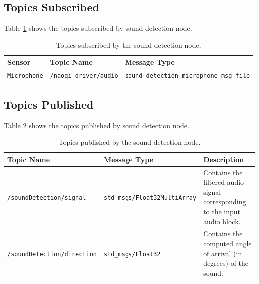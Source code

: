 \documentclass{CSSRforAfrica}
\begin{document}
\subsection*{Topics Subscribed}
Table \ref{Table: topics subscribed} shows the topics subscribed by sound detection node.

\begin{table}[!h]
	\centering
	\begin{tabularx}{\linewidth}{| l | l | X |}
		\hline
		\rowcolor{blue!20} %
		\textbf{Sensor} & \textbf{Topic Name} & \textbf{Message Type} \\
		\hline
		{\footnotesize \texttt{Microphone} }  & {\footnotesize \texttt{/naoqi\_driver/audio}} & {\footnotesize \texttt{sound\_detection\_microphone\_msg\_file}} \\
		\hline
	\end{tabularx}
	\caption{Topics subscribed by the sound detection node.}
	\label{Table: topics subscribed}
\end{table}

\subsection*{Topics Published}

Table \ref{Table: topics published} shows the topics published by sound detection node.

\begin{table}[!h]
	\centering
	\begin{tabularx}{\linewidth}{| l | l | >{\raggedright\arraybackslash}X |}
		\hline
		\rowcolor{blue!20}
		\textbf{Topic Name} & \textbf{Message Type} & \textbf{Description} \\
		\hline
		{\footnotesize \texttt{/soundDetection/signal}}  & {\footnotesize \texttt{std\_msgs/Float32MultiArray}} & {\footnotesize Contains the filtered audio signal corresponding to the input audio block.} \\
		\hline
		{\footnotesize \texttt{/soundDetection/direction}}  & {\footnotesize \texttt{std\_msgs/Float32}} & {\footnotesize Contains the computed angle of arrival (in degrees) of the sound.} \\
		\hline
	\end{tabularx}
	\caption{Topics published by the sound detection node.}
	\label{Table: topics published}
\end{table}

\newpage
\end{document}

